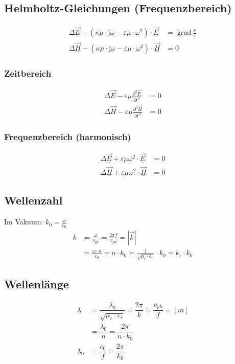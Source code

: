 \subsection{Helmholtz-Gleichungen (Frequenzbereich)}
\begin{align*}
    \Delta \underline{\vec{E}}-\left(\kappa \mu \cdot \mathrm{j} \omega-\varepsilon \mu \cdot \omega^{2}\right) \cdot \underline{\vec{E}} & = \operatorname{grad} \frac{\rho}{\varepsilon} \\
    \Delta \underline{\vec{H}}-\left(\kappa \mu \cdot \mathrm{j} \omega-\varepsilon \mu \cdot \omega^{2}\right) \cdot \underline{\vec{H}} & = 0
\end{align*}

\subsubsection{Zeitbereich}
\begin{align*}
    \Delta \vec{E}-\varepsilon \mu \frac{\partial^{2} \vec{E}}{\partial t^{2}} & =0 \\
    \Delta \vec{H}-\varepsilon \mu \frac{\partial^{2} \vec{H}}{\partial t^{2}} & =0
\end{align*}

\subsubsection{Frequenzbereich (harmonisch)}
\begin{align*}
    \Delta \underline{\vec{E}}+\varepsilon \mu \omega^{2} \cdot \underline{\vec{E}} & =0 \\
    \Delta \underline{\vec{H}}+\varepsilon \mu \omega^{2} \cdot \underline{\vec{H}} & =0
\end{align*}


\subsection{Wellenzahl}
Im Vakuum: $k_{0}=\frac{\omega}{c_{0}}$
\begin{align*}
    k & = \frac{\omega}{v_{p h}} = \frac{2 \pi f}{v_{p h}} = |\vec{k}|                                                              \\
      & = \frac{\omega \cdot n}{c_{0}} = n \cdot k_{0}=\frac{1}{\sqrt{\mu_{r} \cdot \varepsilon_{r}}} \cdot k_{0}=k_{r} \cdot k_{0}
\end{align*}

\subsection{Wellenlänge}
\begin{align*}
    \lambda & = \dfrac{\lambda_0}{\sqrt{\mu_r \cdot \varepsilon_r}} = \dfrac{2 \pi}{k} = \dfrac{v_{ph}}{f} = [m]                                                                      \\
            & = \dfrac{\lambda_0}{n} = \dfrac{2 \pi}{n \cdot k_0} \\
    \lambda_0 & = \dfrac{c_0}{f} = \dfrac{2\pi}{k_0}
\end{align*}

